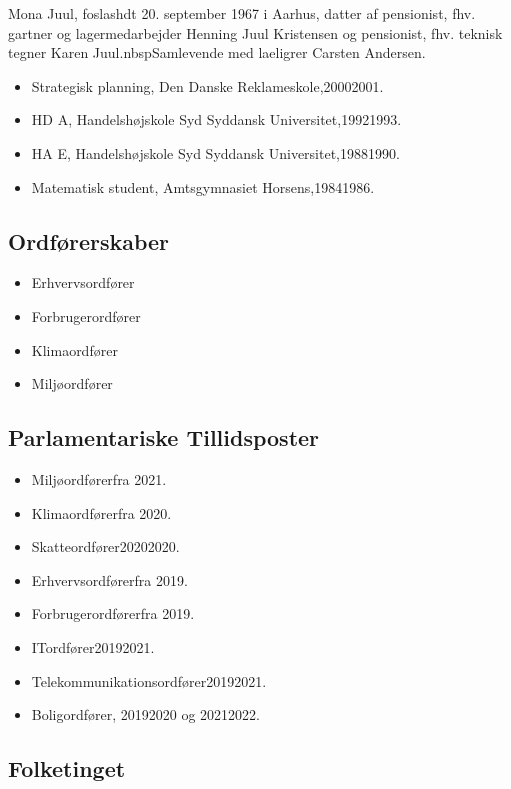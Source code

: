 \documentclass[11pt, a4paper]{awesome-cv}
\begin{document}
\makecvheader[R]
\makelettertitle
\begin{cvletter}
Mona Juul, foslashdt 20. september 1967 i Aarhus, datter af pensionist, fhv. gartner og lagermedarbejder Henning Juul Kristensen og pensionist, fhv. teknisk tegner Karen Juul.nbspSamlevende med laeligrer Carsten Andersen.

\begin{itemize}
\item Strategisk planning, Den Danske Reklameskole,20002001.
\item HD A, Handelshøjskole Syd Syddansk Universitet,19921993.
\item HA E, Handelshøjskole Syd Syddansk Universitet,19881990.
\item Matematisk student, Amtsgymnasiet Horsens,19841986.
\end{itemize}
\subsection*{Ordførerskaber}
\begin{itemize}
\item Erhvervsordfører
\item Forbrugerordfører
\item Klimaordfører
\item Miljøordfører
\end{itemize}
\subsection*{Parlamentariske Tillidsposter}
\begin{itemize}
\item Miljøordførerfra 2021.
\item Klimaordførerfra 2020.
\item Skatteordfører20202020.
\item Erhvervsordførerfra 2019.
\item Forbrugerordførerfra 2019.
\item ITordfører20192021.
\item Telekommunikationsordfører20192021.
\item Boligordfører, 20192020 og 20212022.
\end{itemize}
\subsection*{Folketinget}

\end{cvletter}
\end{document}
